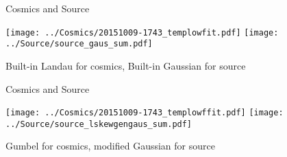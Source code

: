 \documentclass[compress,8pt]{beamer} %
\begin{document}
\begin{frame}{Cosmics and Source}
\begin{adjustwidth}{-2em}{-2em}
\begin{center}
\texttt{[image: ../Cosmics/20151009-1743\_templowfit.pdf]}
\texttt{[image: ../Source/source\_gaus\_sum.pdf]}
\end{center}
\end{adjustwidth}
Built-in Landau for cosmics, Built-in Gaussian for source
\end{frame}



\begin{frame}{Cosmics and Source}
\begin{adjustwidth}{-2em}{-2em}
\begin{center}
\texttt{[image: ../Cosmics/20151009-1743\_templowffit.pdf]}
\texttt{[image: ../Source/source\_lskewgengaus\_sum.pdf]}
\end{center}
\end{adjustwidth}
Gumbel for cosmics, modified Gaussian for source
\end{frame}
\end{document}
